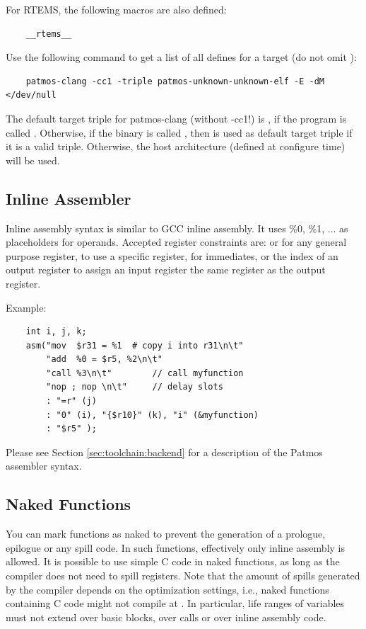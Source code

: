 For RTEMS, the following macros are also defined:

\begin{verbatim}
    __rtems__
\end{verbatim}

Use the following command to get a list of all defines for a target (do not omit ):

\begin{verbatim}
    patmos-clang -cc1 -triple patmos-unknown-unknown-elf -E -dM </dev/null
\end{verbatim}

The default target triple for patmos-clang (without -cc1!) is ,
if the program is called . Otherwise, if the binary is called
, then  is used as default target triple if it is a valid triple.
Otherwise, the host architecture (defined at configure time) will be used.


\subsection{Inline Assembler}

Inline assembly syntax is similar to GCC inline assembly. It uses \%0, \%1, ... as placeholders for
operands. Accepted register constraints are:  or  for any general purpose register,
 to use a specific register,  for immediates, or the index of an output register to
assign an input register the same register as the output register.

Example:
\begin{verbatim}
    int i, j, k;
    asm("mov  $r31 = %1  # copy i into r31\n\t"
        "add  %0 = $r5, %2\n\t"
        "call %3\n\t"        // call myfunction
        "nop ; nop \n\t"     // delay slots
        : "=r" (j)
        : "0" (i), "{$r10}" (k), "i" (&myfunction)
        : "$r5" );
\end{verbatim}

Please see Section \ref{sec:toolchain:backend} for a description of the Patmos assembler syntax.

\subsection{Naked Functions}

You can mark functions as naked to prevent the generation of a prologue, epilogue or any spill code.
In such functions, effectively only inline assembly is allowed. It is possible to use simple C code in naked 
functions, as long as the compiler does not need to spill registers. Note that the amount of spills generated by
the compiler depends on the optimization settings, i.e., naked functions containing C code might not compile at
. In particular, life ranges of variables must not extend over basic blocks, over calls or over
inline assembly code.

